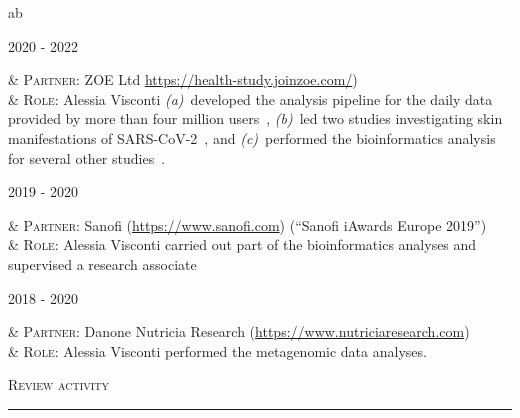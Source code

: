\documentclass[a4paper,10pt]{article}
\newcommand{\mediumtitle}[1]{
	\vspace{0.2cm}
	{\noindent
	\Large \textsc{#1}\\[-2ex]
	\hrule
	\vspace{0.2cm}}
}
\newenvironment{singletablelist}
{	\vspace{-0.2cm}
	\begin{longtable}[!h]{ab}}{\end{longtable}
}
\newcommand{\stlist}[2]{
	\hspace{-3cm}
	\noindent
	\begin{minipage}{0.24\textwidth}
	\begin{flushright}
	\textsc{#1}
	\end{flushright}
	\end{minipage}
	& #2\\[0.2cm]
}
\begin{document}
\begin{singletablelist}

	\stlist{2020 - 2022}{
		\textsc{Partner:} ZOE Ltd \url{https://health-study.joinzoe.com/})\\
		& \textsc{Role:}  Alessia Visconti \emph{(a)}~developed the analysis pipeline for the daily data provided by more than four million users~\cite{Mur21}, \emph{(b)}~led two studies investigating skin manifestations of SARS-CoV-2~\cite{Vis21, Vis22}, and \emph{(c)}~performed the bioinformatics analysis for several other studies~\cite{Men20,Lee20,Zaz20,Hop21,Wil21,Sud21}.
	}	

	\stlist{2019 - 2020}{
		\textsc{Partner:} Sanofi (\url{https://www.sanofi.com}) (``Sanofi iAwards Europe 2019'') \\
		& \textsc{Role:} Alessia Visconti carried out part of the bioinformatics analyses and supervised a research associate
	}
	
	\stlist{2018 - 2020}{
	\textsc{Partner:} Danone Nutricia Research (\url{https://www.nutriciaresearch.com}) \\
	& \textsc{Role:} Alessia Visconti performed the metagenomic data analyses.
	}

\end{singletablelist}

\newpage

\mediumtitle{Review activity}
\end{document}
